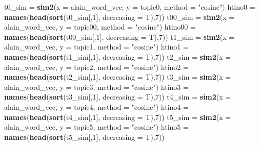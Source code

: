 \documentclass[
]{article}
\newenvironment{Shaded}{\begin{snugshade}}{\end{snugshade}}
\newcommand{\AttributeTok}[1]{\textcolor[rgb]{0.13,0.29,0.53}{#1}}
\newcommand{\DecValTok}[1]{\textcolor[rgb]{0.00,0.00,0.81}{#1}}
\newcommand{\FunctionTok}[1]{\textcolor[rgb]{0.13,0.29,0.53}{\textbf{#1}}}
\newcommand{\NormalTok}[1]{#1}
\newcommand{\OtherTok}[1]{\textcolor[rgb]{0.56,0.35,0.01}{#1}}
\newcommand{\StringTok}[1]{\textcolor[rgb]{0.31,0.60,0.02}{#1}}
\begin{document}
\begin{Shaded}
\begin{Highlighting}[]
\NormalTok{t0\_sim }\OtherTok{=} \FunctionTok{sim2}\NormalTok{(}\AttributeTok{x =}\NormalTok{ alain\_word\_vec, }\AttributeTok{y =}\NormalTok{ topic0, }\AttributeTok{method =} \StringTok{"cosine"}\NormalTok{)}
\NormalTok{htino0 }\OtherTok{=} \FunctionTok{names}\NormalTok{(}\FunctionTok{head}\NormalTok{(}\FunctionTok{sort}\NormalTok{(t0\_sim[,}\DecValTok{1}\NormalTok{], }\AttributeTok{decreasing =}\NormalTok{ T),}\DecValTok{7}\NormalTok{))}
\NormalTok{t00\_sim }\OtherTok{=} \FunctionTok{sim2}\NormalTok{(}\AttributeTok{x =}\NormalTok{ alain\_word\_vec, }\AttributeTok{y =}\NormalTok{ topic00, }\AttributeTok{method =} \StringTok{"cosine"}\NormalTok{)}
\NormalTok{htino00 }\OtherTok{=} \FunctionTok{names}\NormalTok{(}\FunctionTok{head}\NormalTok{(}\FunctionTok{sort}\NormalTok{(t00\_sim[,}\DecValTok{1}\NormalTok{], }\AttributeTok{decreasing =}\NormalTok{ T),}\DecValTok{7}\NormalTok{))}
\NormalTok{t1\_sim }\OtherTok{=} \FunctionTok{sim2}\NormalTok{(}\AttributeTok{x =}\NormalTok{ alain\_word\_vec, }\AttributeTok{y =}\NormalTok{ topic1, }\AttributeTok{method =} \StringTok{"cosine"}\NormalTok{)}
\NormalTok{htino1 }\OtherTok{=} \FunctionTok{names}\NormalTok{(}\FunctionTok{head}\NormalTok{(}\FunctionTok{sort}\NormalTok{(t1\_sim[,}\DecValTok{1}\NormalTok{], }\AttributeTok{decreasing =}\NormalTok{ T),}\DecValTok{7}\NormalTok{))}
\NormalTok{t2\_sim }\OtherTok{=} \FunctionTok{sim2}\NormalTok{(}\AttributeTok{x =}\NormalTok{ alain\_word\_vec, }\AttributeTok{y =}\NormalTok{ topic2, }\AttributeTok{method =} \StringTok{"cosine"}\NormalTok{)}
\NormalTok{htino2 }\OtherTok{=} \FunctionTok{names}\NormalTok{(}\FunctionTok{head}\NormalTok{(}\FunctionTok{sort}\NormalTok{(t2\_sim[,}\DecValTok{1}\NormalTok{], }\AttributeTok{decreasing =}\NormalTok{ T),}\DecValTok{7}\NormalTok{))}
\NormalTok{t3\_sim }\OtherTok{=} \FunctionTok{sim2}\NormalTok{(}\AttributeTok{x =}\NormalTok{ alain\_word\_vec, }\AttributeTok{y =}\NormalTok{ topic3, }\AttributeTok{method =} \StringTok{"cosine"}\NormalTok{)}
\NormalTok{htino3 }\OtherTok{=} \FunctionTok{names}\NormalTok{(}\FunctionTok{head}\NormalTok{(}\FunctionTok{sort}\NormalTok{(t3\_sim[,}\DecValTok{1}\NormalTok{], }\AttributeTok{decreasing =}\NormalTok{ T),}\DecValTok{7}\NormalTok{))}
\NormalTok{t4\_sim }\OtherTok{=} \FunctionTok{sim2}\NormalTok{(}\AttributeTok{x =}\NormalTok{ alain\_word\_vec, }\AttributeTok{y =}\NormalTok{ topic4, }\AttributeTok{method =} \StringTok{"cosine"}\NormalTok{)}
\NormalTok{htino4 }\OtherTok{=} \FunctionTok{names}\NormalTok{(}\FunctionTok{head}\NormalTok{(}\FunctionTok{sort}\NormalTok{(t4\_sim[,}\DecValTok{1}\NormalTok{], }\AttributeTok{decreasing =}\NormalTok{ T),}\DecValTok{7}\NormalTok{))}
\NormalTok{t5\_sim }\OtherTok{=} \FunctionTok{sim2}\NormalTok{(}\AttributeTok{x =}\NormalTok{ alain\_word\_vec, }\AttributeTok{y =}\NormalTok{ topic5, }\AttributeTok{method =} \StringTok{"cosine"}\NormalTok{)}
\NormalTok{htino5 }\OtherTok{=} \FunctionTok{names}\NormalTok{(}\FunctionTok{head}\NormalTok{(}\FunctionTok{sort}\NormalTok{(t5\_sim[,}\DecValTok{1}\NormalTok{], }\AttributeTok{decreasing =}\NormalTok{ T),}\DecValTok{7}\NormalTok{))}
\end{Highlighting}
\end{Shaded}
\end{document}
